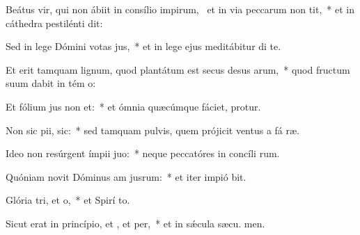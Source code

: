 \item Beátus vir, qui non ábiit in consílio impirum,~\pscross{} et in via peccarum non tit,~* et in cáthedra pestilénti  dit:
\item Sed in lege Dómini votas jus,~* et in lege ejus meditábitur di  te.
\item Et erit tamquam lignum, quod plantátum est secus desus arum,~* quod fructum suum dabit in tém o:
\item Et fólium jus non et:~* et ómnia quæcúmque fáciet, protur.
\item Non sic pii,  sic:~* sed tamquam pulvis, quem prójicit ventus a fá ræ.
\item Ideo non resúrgent ímpii  juo:~* neque peccatóres in concíli rum.
\item Quóniam novit Dóminus am jusrum:~* et iter impió bit.
\item Glória tri, et o,~* et Spirí to.
\item Sicut erat in princípio, et , et per,~* et in sǽcula sæcu. men.
